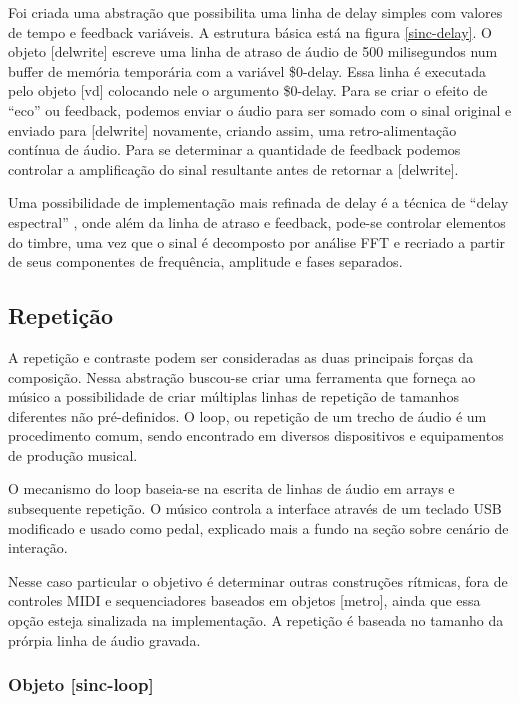 \documentclass{ppgmus}
\begin{document}
Foi criada uma abstração que possibilita uma linha de delay simples com valores
de tempo e feedback variáveis. A estrutura básica está na figura \ref{sinc-delay}. O objeto 
[delwrite\texttildelow] escreve uma linha de atraso de áudio de 500 milisegundos
num buffer de memória temporária com a variável \$0-delay. Essa linha é executada
pelo objeto [vd\texttildelow] colocando nele o argumento \$0-delay. Para se criar
o efeito de ``eco'' ou feedback, podemos enviar o áudio para ser somado com o sinal
original e enviado para [delwrite\texttildelow] novamente, criando assim, uma retro-alimentação
contínua de áudio. Para se determinar a quantidade de feedback podemos controlar a 
amplificação do sinal resultante antes de retornar a [delwrite\texttildelow].


Uma possibilidade de implementação mais refinada de delay é a técnica de ``delay espectral'' \cite{guidefft}, 
onde além da linha de atraso e feedback, pode-se controlar elementos
do timbre, uma vez que o sinal é decomposto por análise FFT e recriado a partir de
seus componentes de frequência, amplitude e fases separados.

\subsection{Repetição}


A repetição e contraste podem ser consideradas as duas principais forças
da composição. Nessa abstração buscou-se criar uma ferramenta que forneça ao músico 
a possibilidade de criar múltiplas linhas de repetição de tamanhos diferentes não pré-definidos.
O loop, ou repetição de um trecho de áudio é um procedimento comum,
sendo encontrado em diversos dispositivos e equipamentos de produção musical.


O mecanismo do loop baseia-se na escrita de linhas de áudio em arrays e subsequente
repetição. O músico controla a interface através de um teclado USB modificado e 
usado como pedal, explicado mais a fundo na seção sobre cenário de interação.

Nesse caso particular o objetivo é determinar outras construções rítmicas,
fora de controles MIDI e sequenciadores baseados em objetos [metro], ainda que essa opção
esteja sinalizada na implementação. A repetição
é baseada no tamanho da prórpia linha de áudio gravada.


\subsubsection{Objeto [sinc-loop]}
\end{document}
